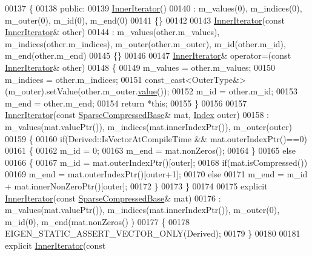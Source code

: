 \begin{DoxyCode}
00137 \{
00138   \textcolor{keyword}{public}:
00139     \hyperlink{class_eigen_1_1_inner_iterator}{InnerIterator}()
00140       : m\_values(0), m\_indices(0), m\_outer(0), m\_id(0), m\_end(0)
00141     \{\}
00142 
00143     \hyperlink{class_eigen_1_1_inner_iterator}{InnerIterator}(\textcolor{keyword}{const} \hyperlink{class_eigen_1_1_inner_iterator}{InnerIterator}& other)
00144       : m\_values(other.m\_values), m\_indices(other.m\_indices), m\_outer(other.m\_outer), m\_id(other.m\_id), 
      m\_end(other.m\_end)
00145     \{\}
00146 
00147     \hyperlink{class_eigen_1_1_inner_iterator}{InnerIterator}& operator=(\textcolor{keyword}{const} \hyperlink{class_eigen_1_1_inner_iterator}{InnerIterator}& other)
00148     \{
00149       m\_values = other.m\_values;
00150       m\_indices = other.m\_indices;
00151       \textcolor{keyword}{const\_cast<}OuterType&\textcolor{keyword}{>}(m\_outer).setValue(other.m\_outer.\hyperlink{class_eigen_1_1_inner_iterator_ab04bccb41eb22ffcb92dc61125aab119}{value}());
00152       m\_id = other.m\_id;
00153       m\_end = other.m\_end;
00154       \textcolor{keywordflow}{return} *\textcolor{keyword}{this};
00155     \}
00156 
00157     \hyperlink{class_eigen_1_1_inner_iterator}{InnerIterator}(\textcolor{keyword}{const} \hyperlink{group___sparse_core___module_class_eigen_1_1_sparse_compressed_base}{SparseCompressedBase}& mat, 
      \hyperlink{group___core___module_a554f30542cc2316add4b1ea0a492ff02}{Index} outer)
00158       : m\_values(mat.valuePtr()), m\_indices(mat.innerIndexPtr()), m\_outer(outer)
00159     \{
00160       \textcolor{keywordflow}{if}(Derived::IsVectorAtCompileTime && mat.outerIndexPtr()==0)
00161       \{
00162         m\_id = 0;
00163         m\_end = mat.nonZeros();
00164       \}
00165       \textcolor{keywordflow}{else}
00166       \{
00167         m\_id = mat.outerIndexPtr()[outer];
00168         \textcolor{keywordflow}{if}(mat.isCompressed())
00169           m\_end = mat.outerIndexPtr()[outer+1];
00170         \textcolor{keywordflow}{else}
00171           m\_end = m\_id + mat.innerNonZeroPtr()[outer];
00172       \}
00173     \}
00174 
00175     \textcolor{keyword}{explicit} \hyperlink{class_eigen_1_1_inner_iterator}{InnerIterator}(\textcolor{keyword}{const} \hyperlink{group___sparse_core___module_class_eigen_1_1_sparse_compressed_base}{SparseCompressedBase}& mat)
00176       : m\_values(mat.valuePtr()), m\_indices(mat.innerIndexPtr()), m\_outer(0), m\_id(0), m\_end(mat.nonZeros()
      )
00177     \{
00178       EIGEN\_STATIC\_ASSERT\_VECTOR\_ONLY(Derived);
00179     \}
00180 
00181     \textcolor{keyword}{explicit} \hyperlink{class_eigen_1_1_inner_iterator}{InnerIterator}(\textcolor{keyword}{const} 

\end{DoxyCode}
